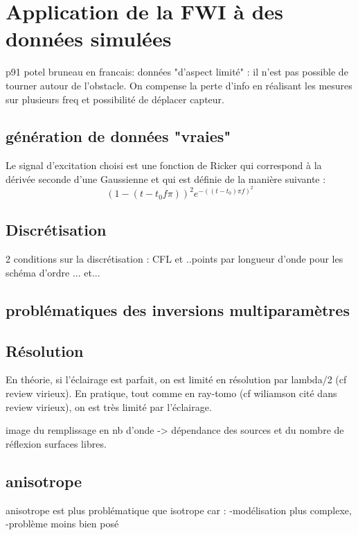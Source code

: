 \chapter{Application de la FWI à des données simulées}

p91 potel bruneau en francais: données "d'aspect limité" : il n'est pas possible de tourner autour de l'obstacle. On compense la perte d'info en réalisant les mesures sur plusieurs freq et possibilité de déplacer capteur.

\section{génération de données "vraies"}
Le signal d'excitation choisi est une fonction de Ricker qui correspond à la dérivée seconde d'une Gaussienne et qui est définie de la manière suivante : 
\begin{equation}
	(1-(t-t_{0}f\pi))^2e^{-((t-t_{0})\pi f)^2}
\end{equation}

\section{Discrétisation}
2 conditions sur la discrétisation : 
CFL et ..points par longueur d'onde pour les schéma d'ordre ... et...

\section{problématiques des inversions multiparamètres}



\section{Résolution}
En théorie, si l'éclairage est parfait, on est limité en résolution par lambda/2 (cf review virieux). En pratique, tout comme en ray-tomo (cf wiliamson cité dans review virieux), on est très limité par l'éclairage.

image du remplissage en nb d'onde -> dépendance des sources et du nombre de réflexion surfaces libres.

\section{anisotrope}

anisotrope est plus problématique que isotrope car : 
-modélisation plus complexe,
-problème moins bien posé

